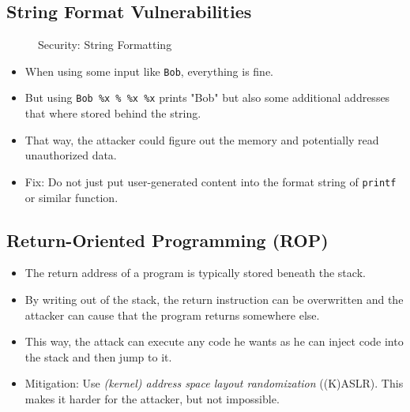         \subsection{String Format Vulnerabilities}
            \begin{figure}[H]
            	\centering
            	
            	\caption{Security: String Formatting}
            \end{figure}
            \begin{itemize}
            	\item When using some input like \texttt{Bob}, everything is fine.
            	\item But using \texttt{Bob \%x \% \%x \%x} prints "Bob" but also some additional addresses that where stored behind the string.
            	\item That way, the attacker could figure out the memory and potentially read unauthorized data.
            	\item Fix: Do not just put user-generated content into the format string of \texttt{printf} or similar function.
            \end{itemize}

        \subsection{Return-Oriented Programming (ROP)}
            \begin{itemize}
            	\item The return address of a program is typically stored beneath the stack.
            	\item By writing out of the stack, the return instruction can be overwritten and the attacker can cause that the program returns somewhere else.
            	\item This way, the attack can execute any code he wants as he can inject code into the stack and then jump to it.
            	\item Mitigation: Use \textit{(kernel) address space layout randomization} ((K)ASLR). This makes it harder for the attacker, but not impossible.
            \end{itemize}
